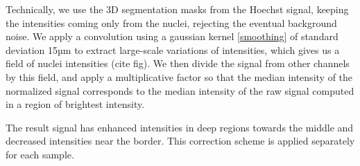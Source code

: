 Technically, we use the 3D segmentation masks from the Hoechst signal, keeping the intensities coming only from the nuclei, rejecting the eventual background noise. We apply a convolution using a gaussian kernel \eqref{smoothing} of standard deviation 15µm to extract large-scale variations of intensities, which gives us a field of nuclei intensities (cite fig). We then divide the signal from other channels by this field, and apply a multiplicative factor so that the median intensity of the normalized signal corresponds to the median intensity of the raw signal computed in a region of brightest intensity.

The result signal has enhanced intensities in deep regions towards the middle and decreased intensities near the border. This correction scheme is applied separately for each sample.